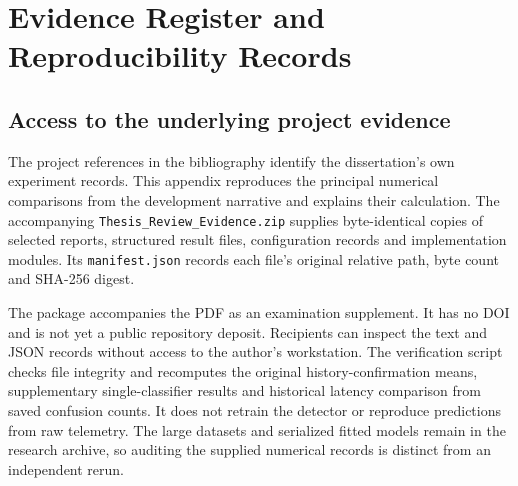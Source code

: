 \chapter{Evidence Register and Reproducibility Records}
\label{app:evidence}

\section{Access to the underlying project evidence}
The project references in the bibliography identify the dissertation's own experiment records. This appendix reproduces the principal numerical comparisons from the development narrative and explains their calculation. The accompanying \texttt{Thesis\_Review\_Evidence.zip} supplies byte-identical copies of selected reports, structured result files, configuration records and implementation modules. Its \texttt{manifest.json} records each file's original relative path, byte count and SHA-256 digest.

The package accompanies the PDF as an examination supplement. It has no DOI and is not yet a public repository deposit. Recipients can inspect the text and JSON records without access to the author's workstation. The verification script checks file integrity and recomputes the original history-confirmation means, supplementary single-classifier results and historical latency comparison from saved confusion counts. It does not retrain the detector or reproduce predictions from raw telemetry. The large datasets and serialized fitted models remain in the research archive, so auditing the supplied numerical records is distinct from an independent rerun.

